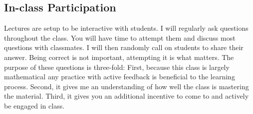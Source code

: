 \hypertarget{grading_participation}{\subsection{In-class Participation}}
Lectures are setup to be interactive with students.
I will regularly ask questions throughout the class.
You will have time to attempt them and discuss most questions with classmates.
I will then randomly call on students to share their answer.
Being correct is not important, attempting it is what matters.
The purpose of these questions is three-fold:
First, because this class is largely mathematical any practice with active feedback is beneficial to the learning process.
Second, it gives me an understanding of how well the class is mastering the material.
Third, it gives you an additional incentive to come to and actively be engaged in class.
